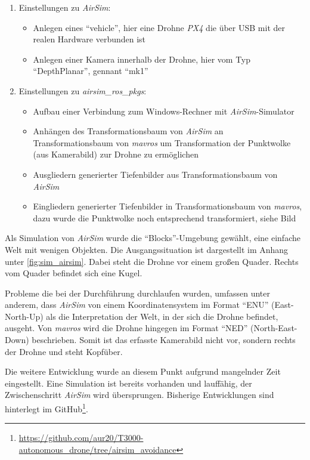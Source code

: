 \begin{enumerate}
\begin{itemize}
    \end{itemize}
    \item Einstellungen zu \textit{AirSim}:
    \begin{itemize}
        \item Anlegen eines \enquote{vehicle}, hier eine Drohne \textit{PX4} die über USB mit der realen Hardware verbunden ist
        \item Anlegen einer Kamera innerhalb der Drohne, hier vom Typ \enquote{DepthPlanar}, gennant \enquote{mk1}
    \end{itemize}
    \item Einstellungen zu \textit{airsim\_ros\_pkgs}:
    \begin{itemize}
        \item Aufbau einer Verbindung zum Windows-Rechner mit \textit{AirSim}-Simulator
        \item Anhängen des Transformationsbaum von \textit{AirSim} an Transformationsbaum von \textit{mavros} um Transformation der Punktwolke (aus Kamerabild) zur Drohne zu ermöglichen  
        \item Ausgliedern generierter Tiefenbilder aus Transformationsbaum von \textit{AirSim}
        \item Eingliedern generierter Tiefenbilder in Transformationsbaum von \textit{mavros}, dazu wurde die Punktwolke noch entsprechend transformiert, siehe Bild 
    \end{itemize} 
\end{enumerate}

Als Simulation von \textit{AirSim} wurde die \enquote{Blocks}-Umgebung gewählt, eine einfache Welt mit wenigen Objekten. Die Ausgangssituation ist dargestellt im Anhang unter \ref{fig:sim_airsim}. Dabei steht die Drohne vor einem großen Quader. Rechts vom Quader befindet sich eine Kugel.

Probleme die bei der Durchführung durchlaufen wurden, umfassen unter anderem, dass \textit{AirSim} von einem Koordinatensystem im Format \enquote{ENU} (East-North-Up) als die Interpretation der Welt, in der sich die Drohne befindet, ausgeht. Von \textit{mavros} wird die Drohne hingegen im Format \enquote{NED} (North-East-Down) beschrieben. Somit ist das erfasste Kamerabild nicht vor, sondern rechts der Drohne und steht Kopfüber.

Die weitere Entwicklung wurde an diesem Punkt aufgrund mangelnder Zeit eingestellt. Eine Simulation ist bereits vorhanden und lauffähig, der Zwischenschritt \textit{AirSim} wird übersprungen. Bisherige Entwicklungen sind hinterlegt im GitHub\footnote{\url{https://github.com/aur20/T3000-autonomous_drone/tree/airsim_avoidance}}.
